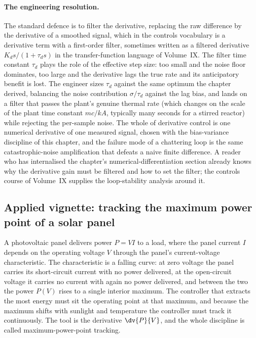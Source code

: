\paragraph{The engineering resolution.}
The standard defence is to filter the derivative, replacing the raw
difference by the derivative of a smoothed signal, which in the
controls vocabulary is a derivative term with a first-order filter,
sometimes written as a filtered derivative $K_{d} s/(1 + \tau_{d} s)$
in the transfer-function language of Volume~IX. The filter time
constant $\tau_{d}$ plays the role of the effective step size: too
small and the noise floor dominates, too large and the derivative lags
the true rate and its anticipatory benefit is lost. The engineer sizes
$\tau_{d}$ against the same optimum the chapter derived, balancing the
noise contribution $\sigma/\tau_{d}$ against the lag bias, and lands on
a filter that passes the plant's genuine thermal rate (which changes on
the scale of the plant time constant $mc/kA$, typically many seconds
for a stirred reactor) while rejecting the per-sample noise. The whole
of derivative control is one numerical derivative of one measured
signal, chosen with the bias-variance discipline of this chapter, and
the failure mode of a chattering loop is the same catastrophic-noise
amplification that defeats a naive finite difference. A reader who has
internalised the chapter's numerical-differentiation section already
knows why the derivative gain must be filtered and how to set the
filter; the controls course of Volume~IX supplies the loop-stability
analysis around it.

\subsection{Applied vignette: tracking the maximum power point of a
solar panel}

A photovoltaic panel delivers power $P = V I$ to a load, where the
panel current $I$ depends on the operating voltage $V$ through the
panel's current-voltage characteristic. The characteristic is a
falling curve: at zero voltage the panel carries its short-circuit
current with no power delivered, at the open-circuit voltage it carries
no current with again no power delivered, and between the two the power
$P(V)$ rises to a single interior maximum. The controller that
extracts the most energy must sit the operating point at that maximum,
and because the maximum shifts with sunlight and temperature the
controller must track it continuously. The tool is the derivative
$\dv{P}{V}$, and the whole discipline is called maximum-power-point
tracking.

